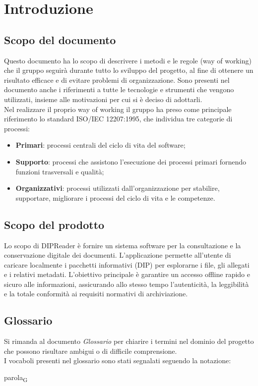 \documentclass[a4paper,12pt]{article}
\begin{document}
\newpage

\tableofcontents
\newpage

\section{Introduzione}
    \subsection{Scopo del documento}
        Questo documento ha lo scopo di descrivere i metodi e le regole (way of working) che il gruppo seguirà durante tutto lo sviluppo del progetto, al fine di ottenere un risultato efficace e di evitare problemi di organizzazione.
        Sono presenti nel documento anche i riferimenti a tutte le tecnologie e strumenti che vengono utilizzati, insieme alle motivazioni per cui si è deciso di adottarli.\\
        Nel realizzare il proprio way of working il gruppo ha preso come principale riferimento lo standard ISO/IEC 12207:1995, che individua tre categorie di processi:
        \begin{itemize}
            \item \textbf{Primari}: processi centrali del ciclo di vita del software;
            \item \textbf{Supporto}: processi che assistono l'esecuzione dei processi primari fornendo funzioni trasversali e qualità;
            \item \textbf{Organizzativi}: processi utilizzati dall'organizzazione per stabilire, supportare, migliorare i processi del ciclo di vita e le competenze.
        \end{itemize}

    \subsection{Scopo del prodotto}
        Lo scopo di DIPReader è fornire un sistema software per la consultazione e la conservazione digitale dei documenti. L'applicazione permette all'utente di caricare localmente i pacchetti informativi (DIP) per esplorarne i file, gli allegati e i relativi metadati. L'obiettivo principale è garantire un accesso offline rapido e sicuro alle informazioni, assicurando allo stesso tempo l'autenticità, la leggibilità e la totale conformità ai requisiti normativi di archiviazione.


    \subsection{Glossario}
        Si rimanda al documento \textit{Glossario} per chiarire i termini nel dominio del progetto che possono risultare ambigui o di difficile comprensione.\\
        I vocaboli presenti nel glossario sono stati segnalati seguendo la notazione:
        \begin{center}
            parola\textsubscript{G}
        \end{center}
\end{document}
